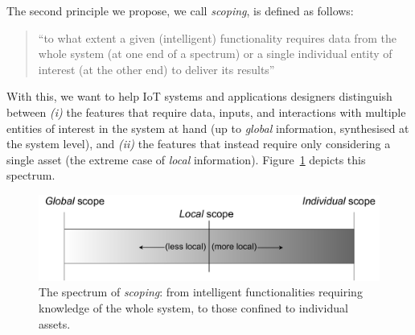 
The second principle we propose, we call \emph{scoping}, is defined as follows:
\begin{quote}
    ``to what extent a given (intelligent) functionality requires data from the whole system (at one end of a spectrum) or a single individual entity of interest (at the other end) to deliver its results''
\end{quote}
With this, we want to help IoT systems and applications designers distinguish between \emph{(i)} the features that require data, inputs, and interactions with multiple entities of interest in the system at hand (up to \emph{global} information, synthesised at the system level), and \emph{(ii)} the features that instead require only considering a single asset (the extreme case of \emph{local} information). 
Figure~\ref{fig:scope} depicts this spectrum. 

\begin{figure}[!b]
    \centering
    \includegraphics[width=.6\columnwidth]{figures/dt-mas/scope-spectrum.pdf}
    \caption{The spectrum of \emph{scoping}: from intelligent functionalities requiring knowledge of the whole system, to those confined to individual assets.}
    \label{fig:scope}
   
\end{figure}


